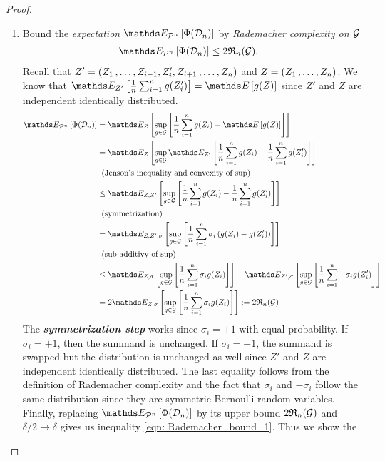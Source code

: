 \documentclass[11pt]{article}
\begin{document}
\begin{itemize}
\begin{proof}
\begin{enumerate}
\item Bound the \emph{expectation} $\E{\cP^{n}}{\Phi(\cD_n)}$ by \emph{Rademacher complexity on ${\mathcal G}$}
\begin{align*}
\E{\cP^{n}}{\Phi(\cD_n)} &\le 2   \frR_{n}(\cG).
\end{align*} Recall that $Z'  = (Z_1 \,{,}\ldots{,}\, Z_{i-1}, Z_i', Z_{i+1} \,{,}\ldots{,}\, Z_n)$ and $Z = (Z_1 \,{,}\ldots{,}\, Z_n)$. We know that $\E{Z'}{\frac{1}{n}\sum_{i=1}^{n}g(Z_i')} =  \E{}{g(Z)}$ since $Z'$ and $Z$ are independent identically distributed.
\begin{align}
\E{\cP^{n}}{\Phi(\cD_n)} &= \E{Z}{\sup_{g \in \cG}\brac{\frac{1}{n}\sum_{i=1}^{n}g(Z_i) - \E{}{g(Z)}}} \nonumber\\
&= \E{Z}{\sup_{g \in \cG}\E{Z'}{ \frac{1}{n}\sum_{i=1}^{n}g(Z_i) - \frac{1}{n}\sum_{i=1}^{n}g(Z_i') }} \nonumber\\
& \;\;(\text{Jenson's inequality and convexity of $\sup$}) \nonumber\\
&\le \E{Z, Z'}{\sup_{g \in \cG}\brac{ \frac{1}{n}\sum_{i=1}^{n}g(Z_i) - \frac{1}{n}\sum_{i=1}^{n}g(Z_i') }} \nonumber\\
& \;\; (\text{symmetrization}) \nonumber\\
& =\E{Z, Z', \sigma}{\sup_{g \in \cG}\brac{\frac{1}{n}\sum_{i=1}^{n}\sigma_i\paren{g(Z_i) - g(Z_i')}}} \nonumber\\
& \;\; (\text{sub-additivy of $\sup$}) \nonumber\\
&\le \E{Z, \sigma}{\sup_{g \in \cG}\brac{\frac{1}{n}\sum_{i=1}^{n}\sigma_i g(Z_i) }}+ \E{Z', \sigma}{\sup_{g \in \cG}\brac{\frac{1}{n}\sum_{i=1}^{n}-\sigma_i g(Z_i')}} \nonumber\\
&= 2 \E{Z, \sigma}{\sup_{g \in \cG}\brac{\frac{1}{n}\sum_{i=1}^{n}\sigma_i g(Z_i) }} := 2\frR_n(\cG) \label{pf: rad_comp_bound_2}
\end{align}
The \emph{\textbf{symmetrization step}} works since $\sigma_i = \pm 1$ with equal probability. If $\sigma_i = +1$, then the summand is unchanged. If $\sigma_i = -1$, the summand is swapped but the distribution  is unchanged as well since  $Z'$ and $Z$ are independent identically distributed.
The last equality follows from the definition of Rademacher complexity and the fact that $\sigma_i$ and $-\sigma_i$ follow the same distribution since they are symmetric Bernoulli random variables. Finally, replacing $\E{\cP^{n}}{\Phi(\cD_n)}$ by its upper bound $2{\mathfrak R}_n({\mathcal G})$ and $\delta/2 \to \delta$ gives us  inequality \eqref{eqn: Rademacher_bound_1}.
Thus we show the


\end{enumerate}
\end{proof}
\end{itemize}
\end{document}
